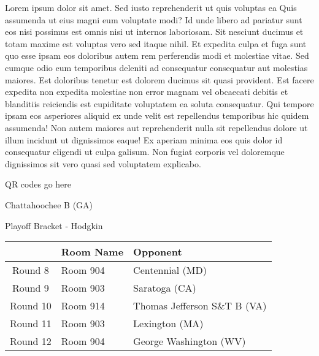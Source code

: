 \documentclass{article}%
\begin{document}
\vspace*{8pt}%
\linebreak%
\newline%
\newline%
Lorem ipsum dolor sit amet. Sed iusto reprehenderit ut quis voluptas ea Quis assumenda ut eius magni eum voluptate modi? Id unde libero ad pariatur sunt eos nisi possimus est omnis nisi ut internos laboriosam. Sit nesciunt ducimus et totam maxime est voluptas vero sed itaque nihil. Et expedita culpa et fuga sunt quo esse ipsam eos doloribus autem rem perferendis modi et molestiae vitae.\newline%
\newline%
Sed cumque odio eum temporibus deleniti ad consequatur consequatur aut molestias maiores. Est doloribus tenetur est dolorem ducimus sit quasi provident. Est facere expedita non expedita molestiae non error magnam vel obcaecati debitis et blanditiis reiciendis est cupiditate voluptatem ea soluta consequatur. Qui tempore ipsam eos asperiores aliquid ex unde velit est repellendus temporibus hic quidem assumenda!\newline%
\newline%
Non autem maiores aut reprehenderit nulla sit repellendus dolore ut illum incidunt ut dignissimos eaque! Ex aperiam minima eos quis dolor id consequatur eligendi ut culpa galisum. Non fugiat corporis vel doloremque dignissimos sit vero quasi sed voluptatem explicabo.\newline%
\newline%
%
\vspace*{30pt}%
\begin{center}%
\begin{Huge}%
QR codes go here%
\end{Huge}%
\end{center}%
\newpage%
\begin{center}%
\begin{Huge}%
Chattahoochee B (GA)%
\end{Huge}%
\vspace*{8pt}%
\linebreak%
\begin{Large}%
Playoff Bracket {-} Hodgkin%
\end{Large}%
\end{center}%
%
\begin{tabularx}{\textwidth}{|c|Y|Y|}%
\hline%
&Room Name&Opponent\\%
\hline%
Round 8&Room 904&Centennial (MD)\\%
Round 9&Room 903&Saratoga (CA)\\%
Round 10&Room 914&Thomas Jefferson S\&T B (VA)\\%
Round 11&Room 903&Lexington (MA)\\%
Round 12&Room 904&George Washington (WV)\\%
\hline%
\end{tabularx}%
\end{document}
